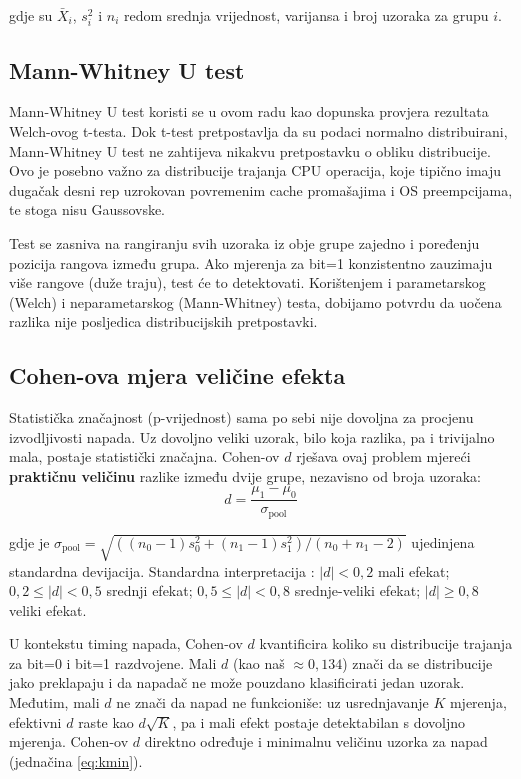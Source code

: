 \noindent gdje su $\bar{X}_i$, $s_i^2$ i $n_i$ redom srednja vrijednost, varijansa i broj uzoraka za grupu $i$.

\subsection{Mann-Whitney U test}

Mann-Whitney U test \cite{mann1947} koristi se u ovom radu kao dopunska provjera rezultata Welch-ovog t-testa. Dok t-test pretpostavlja da su podaci normalno distribuirani, Mann-Whitney U test ne zahtijeva nikakvu pretpostavku o obliku distribucije. Ovo je posebno važno za distribucije trajanja CPU operacija, koje tipično imaju dugačak desni rep uzrokovan povremenim cache promašajima i OS preempcijama, te stoga nisu Gaussovske.

Test se zasniva na rangiranju svih uzoraka iz obje grupe zajedno i poređenju pozicija rangova između grupa. Ako mjerenja za bit=1 konzistentno zauzimaju više rangove (duže traju), test će to detektovati. Korištenjem i parametarskog (Welch) i neparametarskog (Mann-Whitney) testa, dobijamo  potvrdu da uočena razlika nije posljedica distribucijskih pretpostavki.

\subsection{Cohen-ova mjera veličine efekta}

Statistička značajnost (p-vrijednost) sama po sebi nije dovoljna za procjenu izvodljivosti napada. Uz dovoljno veliki uzorak, bilo koja razlika, pa i trivijalno mala, postaje statistički značajna. Cohen-ov $d$ \cite{cohen1988} rješava ovaj problem mjereći \textbf{praktičnu veličinu} razlike između dvije grupe, nezavisno od broja uzoraka:
\begin{equation}
d = \frac{\mu_1 - \mu_0}{\sigma_{\text{pool}}}
\label{eq:cohens_d}
\end{equation}

\noindent gdje je $\sigma_{\text{pool}} = \sqrt{((n_0-1)s_0^2 + (n_1-1)s_1^2)/(n_0+n_1-2)}$ ujedinjena standardna devijacija.
Standardna interpretacija \cite{cohen1988}: $|d| < 0{,}2$ mali efekat; $0{,}2 \leq |d| < 0{,}5$ srednji efekat; $0{,}5 \leq |d| < 0{,}8$ srednje-veliki efekat; $|d| \geq 0{,}8$ veliki efekat.

U kontekstu timing napada, Cohen-ov $d$ kvantificira koliko su distribucije trajanja za bit=0 i bit=1 razdvojene. Mali $d$ (kao naš $\approx 0{,}134$) znači da se distribucije jako preklapaju i da napadač ne može pouzdano klasificirati jedan uzorak. Međutim, mali $d$ ne znači da napad ne funkcioniše: uz usrednjavanje $K$ mjerenja, efektivni $d$ raste kao $d\sqrt{K}$, pa i mali efekt postaje detektabilan s dovoljno mjerenja. Cohen-ov $d$ direktno određuje i minimalnu veličinu uzorka za napad (jednačina \ref{eq:kmin}).

